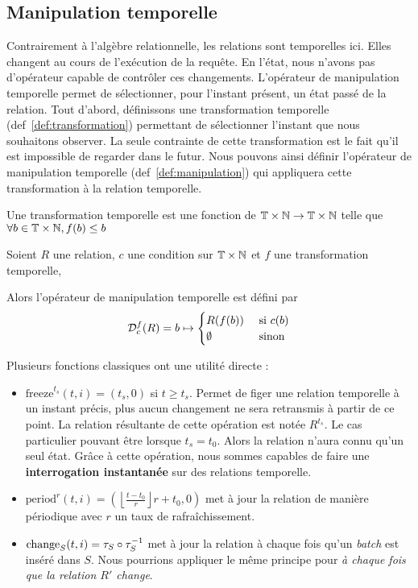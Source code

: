 \subsection{Manipulation temporelle}\label{sec:contrib:astral:manipulation}
Contrairement à l'algèbre relationnelle, les relations sont temporelles ici. Elles changent au cours de l'exécution de la requête. En l'état, nous n'avons pas d'opérateur capable de contrôler ces changements. L'opérateur de manipulation temporelle permet de sélectionner, pour l'instant présent, un état passé de la relation. Tout d'abord, définissons une transformation temporelle (def~\ref{def:transformation}) permettant de sélectionner l'instant que nous souhaitons observer. La seule contrainte de cette transformation est le fait qu'il est impossible de regarder dans le futur. Nous pouvons ainsi définir l'opérateur de manipulation temporelle (def~\ref{def:manipulation}) qui appliquera cette transformation à la relation temporelle.
\begin{defi}\label{def:transformation}
    Une transformation temporelle est une fonction de $\mathbb{T}\times\mathbb{N}\to\mathbb{T}\times\mathbb{N}$ telle que $\forall b\in\mathbb{T}\times\mathbb{N}, f(b) \leq b$
\end{defi}

\begin{defi}\label{def:manipulation}
    Soient $R$ une relation, $c$ une condition sur $\mathbb{T}\times\mathbb{N}$ et $f$ une transformation temporelle,

    Alors l'opérateur de manipulation temporelle est défini par $$\mathcal{D}_c^f(R) = b \mapsto \begin{cases} R(f(b)) & \textrm{ si } c(b) \\ \emptyset & \textrm{ sinon}\end{cases}$$
\end{defi}

Plusieurs fonctions classiques ont une utilité directe :
\begin{itemize}
 \item $\mathrm{freeze}^{t_s}(t,i)=(t_s,0)$ si $t \geq t_s$. Permet de figer une relation temporelle à un instant précis, plus aucun changement ne sera retransmis à partir de ce point. La relation résultante de cette opération est notée $R^{t_s}$. Le cas particulier pouvant être lorsque $t_s=t_0$. Alors la relation n'aura connu qu'un seul état. Grâce à cette opération, nous sommes capables de faire une \textbf{interrogation instantanée} sur des relations temporelle.
 \item $\mathrm{period}^r(t,i)=\left(\left\lfloor\frac{t-t_0}{r}\right\rfloor r + t_0, 0\right)$ met à jour la relation de manière périodique avec $r$ un taux de rafraîchissement.
 \item $\mathrm{change}_S(t,i)=\tau_S\circ\tau^{-1}_S$ met à jour la relation à chaque fois qu'un \textit{batch} est inséré dans $S$. Nous pourrions appliquer le même principe pour \textit{à chaque fois que la relation $R'$ change}.
\end{itemize}

